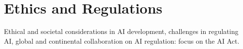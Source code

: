 \section{Ethics and Regulations}
Ethical and societal considerations in AI development, challenges in regulating AI, global and continental collaboration on AI regulation: focus on the AI Act.